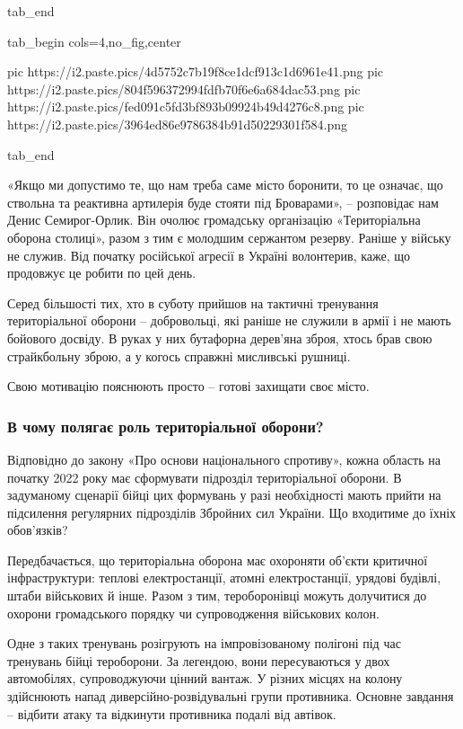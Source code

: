   tab_end

  tab_begin cols=4,no_fig,center

		 pic https://i2.paste.pics/4d5752c7b19f8ce1dcf913c1d6961e41.png
		 pic https://i2.paste.pics/804f596372994fdfb70f6e6a684dac53.png
		 pic https://i2.paste.pics/fed091c5fd3bf893b09924b49d4276c8.png
		 pic https://i2.paste.pics/3964ed86e9786384b91d50229301f584.png

  tab_end

\fi

«Якщо ми допустимо те, що нам треба саме місто боронити, то це означає, що
ствольна та реактивна артилерія буде стояти під Броварами», – розповідає нам
Денис Семирог-Орлик. Він очолює громадську організацію «Територіальна оборона
столиці», разом з тим є молодшим сержантом резерву. Раніше у війську не служив.
Від початку російської агресії в Україні волонтерив, каже, що продовжує це
робити по цей день.


Серед більшості тих, хто в суботу прийшов на тактичні тренування територіальної
оборони – добровольці, які раніше не служили в армії і не мають бойового
досвіду. В руках у них бутафорна дерев’яна зброя, хтось брав свою страйкбольну
зброю, а у когось справжні мисливські рушниці.

Свою мотивацію пояснюють просто – готові захищати своє місто.

\subsubsection{В чому полягає роль територіальної оборони?}

Відповідно до закону «Про основи національного спротиву», кожна область на
початку 2022 року має сформувати підрозділ територіальної оборони. В задуманому
сценарії бійці цих формувань у разі необхідності мають прийти на підсилення
регулярних підрозділів Збройних сил України. Що входитиме до їхніх обов’язків?

Передбачається, що територіальна оборона має охороняти об’єкти критичної
інфраструктури: теплові електростанції, атомні електростанції, урядові будівлі,
штаби військових й інше. Разом з тим, тероборонівці можуть долучитися до
охорони громадського порядку чи супроводження військових колон.


Одне з таких тренувань розігрують на імпровізованому полігоні під час тренувань
бійці тероборони. За легендою, вони пересуваються у двох автомобілях,
супроводжуючи цінний вантаж. У різних місцях на колону здійснюють напад
диверсійно-розвідувальні групи противника. Основне завдання – відбити атаку та
відкинути противника подалі від автівок.

